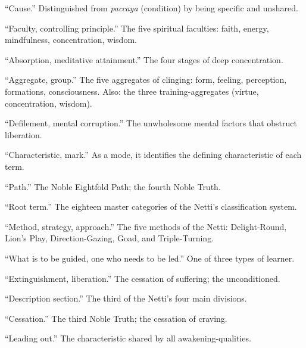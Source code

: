 \begin{description}[style=nextline, labelwidth=3.5cm, leftmargin=3.8cm, font=\itshape]
\item[hetu] ``Cause.'' Distinguished from \textit{paccaya} (condition) by being specific and unshared.

\item[indriya] ``Faculty, controlling principle.'' The five spiritual faculties: faith, energy, mindfulness, concentration, wisdom.

\item[jhāna] ``Absorption, meditative attainment.'' The four stages of deep concentration.

\item[khandha] ``Aggregate, group.'' The five aggregates of clinging: form, feeling, perception, formations, consciousness. Also: the three training-aggregates (virtue, concentration, wisdom).

\item[kilesa] ``Defilement, mental corruption.'' The unwholesome mental factors that obstruct liberation.

\item[lakkhaṇa] ``Characteristic, mark.'' As a mode, it identifies the defining characteristic of each term.

\item[magga] ``Path.'' The Noble Eightfold Path; the fourth Noble Truth.

\item[mūlapada] ``Root term.'' The eighteen master categories of the Netti's classification system.

\item[naya] ``Method, strategy, approach.'' The five methods of the Netti: Delight-Round, Lion's Play, Direction-Gazing, Goad, and Triple-Turning.

\item[neyya] ``What is to be guided, one who needs to be led.'' One of three types of learner.

\item[nibbāna] ``Extinguishment, liberation.'' The cessation of suffering; the unconditioned.

\item[niddesavāra] ``Description section.'' The third of the Netti's four main divisions.

\item[nirodha] ``Cessation.'' The third Noble Truth; the cessation of craving.

\item[niyyāna] ``Leading out.'' The characteristic shared by all awakening-qualities.


\end{description}

